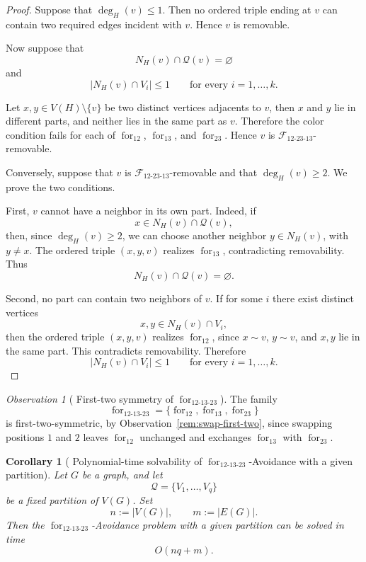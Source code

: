 \documentclass[12pt]{article}
\theoremstyle{plain}
\newtheorem{corollary}[theorem]{Corollary}
\theoremstyle{definition}
\theoremstyle{remark}
\newtheorem{observation}[theorem]{Observation}
\theoremstyle{definition}
\newcommand{\forlabel}{\mathrm{for}}
\DeclareRobustCommand{\forparam}[1]{%
  \ensuremath{\mathop{\forlabel}\nolimits_{#1}}%
}
\begin{document}
\begin{proof}
Suppose that \(\deg_H(v)\le 1\). Then no ordered triple ending at \(v\) can contain two required edges incident
with \(v\). Hence \(v\) is removable.

Now suppose that
\[
N_H(v)\cap \mathcal Q(v)=\varnothing
\]
and
\[
|N_H(v)\cap V_i|\le 1
\qquad\text{for every } i=1,\dots,k.
\]

Let \(x,y\in V(H)\setminus\{v\}\) be two distinct vertices adjacents to \(v\), then \(x\) and \(y\)
lie in different parts, and neither lies in the same part as \(v\). Therefore the color condition fails for each of
\(\operatorname{for}_{12}\), \(\operatorname{for}_{13}\), and \(\operatorname{for}_{23}\). Hence \(v\) is
\(\mathcal F_{12\text{-}23\text{-}13}\)-removable.

Conversely, suppose that \(v\) is \(\mathcal F_{12\text{-}23\text{-}13}\)-removable and that \(\deg_H(v)\ge 2\).
We prove the two conditions.

First, \(v\) cannot have a neighbor in its own part. Indeed, if
\[
x\in N_H(v)\cap \mathcal Q(v),
\]
then, since \(\deg_H(v)\ge 2\), we can choose another neighbor \(y\in N_H(v)\), with \(y\neq x\). The ordered triple
\((x,y,v)\) realizes \(\operatorname{for}_{13}\), contradicting removability. Thus
\[
N_H(v)\cap \mathcal Q(v)=\varnothing.
\]

Second, no part can contain two neighbors of \(v\). If for some \(i\) there exist distinct vertices
\[
x,y\in N_H(v)\cap V_i,
\]
then the ordered triple \((x,y,v)\) realizes \(\operatorname{for}_{12}\), since \(x\sim v\), \(y\sim v\), and \(x,y\)
lie in the same part. This contradicts removability. Therefore
\[
|N_H(v)\cap V_i|\le 1
\qquad\text{for every } i=1,\dots,k.
\]

\end{proof}



\begin{observation}[
First-two symmetry of
\texorpdfstring{\(\forparam{12\text{-}13\text{-}23}\)}
{for12-13-23}
]
\label{obs:for12-13-23-first-two-symmetric}
The family
\[
\forparam{12\text{-}13\text{-}23}
=
\{\forparam{12},\forparam{13},\forparam{23}\}
\]
is first-two-symmetric, by Observation~\ref{rem:swap-first-two}, since swapping positions \(1\) and \(2\)
leaves \(\forparam{12}\) unchanged and exchanges
\(\forparam{13}\) with \(\forparam{23}\).
\end{observation}



\begin{corollary}[
Polynomial-time solvability of
\texorpdfstring{\(\forparam{12\text{-}13\text{-}23}\)-Avoidance with a given partition}
{for12-13-23-Avoidance with a given partition}
]
\label{cor:for12-13-23-given-partition-polynomial}
Let \(G\) be a graph, and let
\[
\mathcal Q=\{V_1,\dots,V_q\}
\]
be a fixed partition of \(V(G)\). Set
\[
n:=|V(G)|,
\qquad
m:=|E(G)|.
\]
Then the \(\forparam{12\text{-}13\text{-}23}\)-Avoidance problem with a
given partition can be solved in time
\[
O(nq+m).
\]
\end{corollary}
\end{document}
